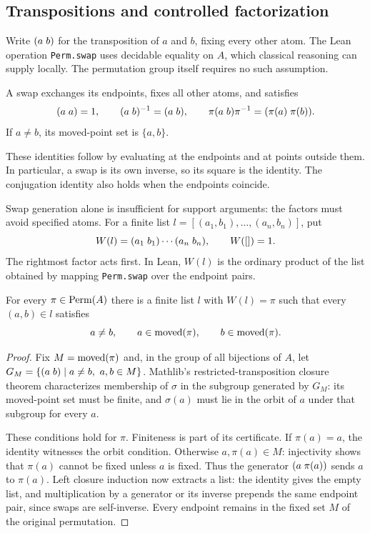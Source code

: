 \subsection{Transpositions and controlled factorization}
\label{sec:swaps}
\label{sec:controlled-swaps}

Write $(a\;b)$ for the transposition of $a$ and $b$, fixing every other
atom. The Lean operation \texttt{Perm.swap} uses decidable equality on
$A$, which classical reasoning can supply locally. The permutation group
itself requires no such assumption.

\begin{proposition}
\label{prop:swaps}
A swap exchanges its endpoints, fixes all other atoms, and satisfies
\[
  (a\;a)=1,\qquad (a\;b)^{-1}=(a\;b),\qquad
  \pi(a\;b)\pi^{-1}=(\pi(a)\;\pi(b)).
\]
If $a\ne b$, its moved-point set is $\{a,b\}$.
\end{proposition}

These identities follow by evaluating at the endpoints and at points
outside them. In particular, a swap is its own inverse, so its square is
the identity. The conjugation identity also holds when the endpoints
coincide.

Swap generation alone is insufficient for support arguments: the factors
must avoid specified atoms. For a finite list
$l=[(a_1,b_1),\ldots,(a_n,b_n)]$, put
\[
  W(l)=(a_1\;b_1)\cdots(a_n\;b_n),\qquad W([])=1.
\]
The rightmost factor acts first. In Lean, $W(l)$ is the ordinary product
of the list obtained by mapping \texttt{Perm.swap} over the endpoint pairs.

\begin{proposition}
\label{prop:controlled-factorization}
For every $\pi\in\operatorname{Perm}(A)$ there is a finite list $l$ with $W(l)=\pi$
such that every $(a,b)\in l$ satisfies
\[
  a\ne b,\qquad a\in\operatorname{moved}(\pi),\qquad b\in\operatorname{moved}(\pi).
\]
\end{proposition}

\begin{proof}
Fix $M=\operatorname{moved}(\pi)$ and, in the group of all bijections of $A$, let
$G_M=\{(a\;b)\mid a\ne b,\ a,b\in M\}$.
Mathlib's restricted-transposition closure theorem characterizes membership
of $\sigma$ in the subgroup generated by $G_M$: its moved-point set must
be finite, and $\sigma(a)$ must lie in the orbit of $a$ under that subgroup
for every $a$.

These conditions hold for $\pi$. Finiteness is part of its certificate.
If $\pi(a)=a$, the identity witnesses the orbit condition. Otherwise
$a,\pi(a)\in M$: injectivity shows that $\pi(a)$ cannot be fixed unless
$a$ is fixed. Thus the generator $(a\;\pi(a))$ sends $a$ to $\pi(a)$.
Left closure induction now extracts a list: the identity gives the empty
list, and multiplication by a generator or its inverse prepends the same
endpoint pair, since swaps are self-inverse. Every endpoint remains in
the fixed set $M$ of the original permutation.
\end{proof}

